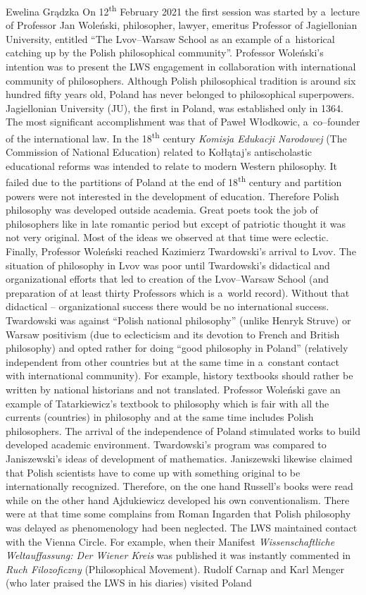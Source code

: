 \begin{editorialeng}{Ewelina Grądzka}
On 12\textsuperscript{th} February 2021 the first session was started by a~lecture of Professor Jan Woleński, philosopher, lawyer, emeritus Professor of Jagiellonian University, entitled ``The Lvov--Warsaw School as an example of a~historical catching up by the Polish philosophical community''. Professor Woleński’s intention was to present the LWS engagement in collaboration with international community of philosophers. Although Polish philosophical tradition is around six hundred fifty years old, Poland has never belonged to philosophical superpowers. Jagiellonian University (JU), the first in Poland, was established only in 1364. The most significant accomplishment was that of Paweł Włodkowic, a~co--founder of the international law. In the 18\textsuperscript{th} century \textit{Komisja Edukacji Narodowej} (The Commission of National Education) related to Kołłątaj’s antischolastic educational reforms was intended to relate to modern Western philosophy. It failed due to the partitions of Poland at the end of 18\textsuperscript{th} century and partition powers were not interested in the development of education. Therefore Polish philosophy was developed outside academia. Great poets took the job of philosophers like in late romantic period but except of patriotic thought it was not very original. Most of the ideas we observed at that time were eclectic. Finally, Professor Woleński reached Kazimierz Twardowski’s arrival to Lvov. The situation of philosophy in Lvov was poor until Twardowski’s didactical and organizational efforts that led to creation of the Lvov--Warsaw School (and preparation of at least thirty Professors which is a~world record). Without that didactical -- organizational success there would be no international success. Twardowski was against ``Polish national philosophy'' (unlike Henryk Struve) or Warsaw positivism (due to eclecticism and its devotion to French and British philosophy) and opted rather for doing ``good philosophy in Poland'' (relatively independent from other countries but at the same time in a~constant contact with international community). For example, history textbooks should rather be written by national historians and not translated. Professor Woleński gave an example of Tatarkiewicz’s textbook to philosophy which is fair with all the currents (countries) in philosophy and at the same time includes Polish philosophers. The arrival of the independence of Poland stimulated works to build developed academic environment. Twardowski’s program was compared to Janiszewski’s ideas of development of mathematics. Janiszewski likewise claimed that Polish scientists have to come up with something original to be internationally recognized. Therefore, on the one hand Russell’s books were read while on the other hand Ajdukiewicz developed his own conventionalism. There were at that time some complains from Roman Ingarden that Polish philosophy was delayed as phenomenology had been neglected. The LWS maintained contact with the Vienna Circle. For example, when their Manifest \textit{Wissenschaftliche Weltauffassung: Der Wiener Kreis} was published it was instantly commented in \textit{Ruch Filozoficzny} (Philosophical Movement). Rudolf Carnap and Karl Menger (who later praised the LWS in his diaries) visited Poland 
\end{editorialeng}
